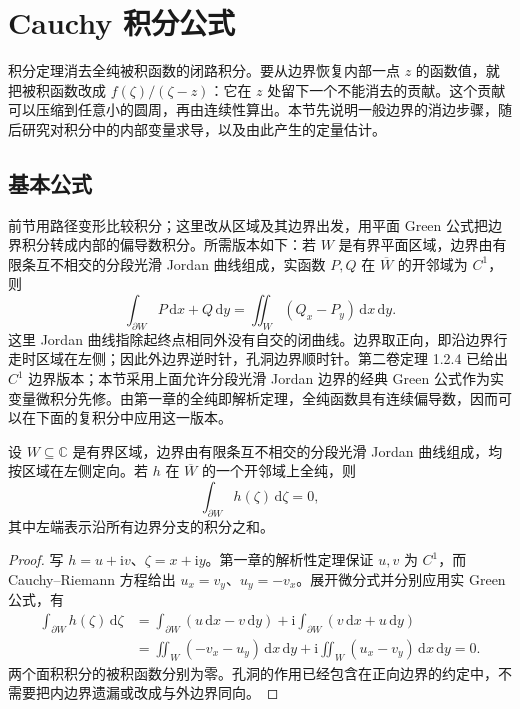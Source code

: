 \section{Cauchy 积分公式}
\label{b3:sec:0203}

积分定理消去全纯被积函数的闭路积分。要从边界恢复内部一点 \(z\) 的函数值，就把被积函数改成 \(f(\zeta)/(\zeta-z)\)：它在 \(z\) 处留下一个不能消去的贡献。这个贡献可以压缩到任意小的圆周，再由连续性算出。本节先说明一般边界的消边步骤，随后研究对积分中的内部变量求导，以及由此产生的定量估计。

\subsection{基本公式}
\label{b3:subsec:020301}

前节用路径变形比较积分；这里改从区域及其边界出发，用平面 Green 公式把边界积分转成内部的偏导数积分。所需版本如下：若 \(W\) 是有界平面区域，边界由有限条互不相交的分段光滑 Jordan 曲线组成，实函数 \(P,Q\) 在 \(\overline W\) 的开邻域为 \(C^1\)，则
\[
 \int_{\partial W}P\,\mathrm{d}x+Q\,\mathrm{d}y
 =\iint_W(Q_x-P_y)\,\mathrm{d}x\,\mathrm{d}y.
\]
这里 Jordan 曲线指除起终点相同外没有自交的闭曲线。边界取正向，即沿边界行走时区域在左侧；因此外边界逆时针，孔洞边界顺时针。第二卷定理 1.2.4 已给出 \(C^1\) 边界版本；本节采用上面允许分段光滑 Jordan 边界的经典 Green 公式作为实变量微积分先修。由第一章的全纯即解析定理，全纯函数具有连续偏导数，因而可以在下面的复积分中应用这一版本。

\begin{lemma}\label{b3:lem:02-cauchy-boundary}
设 \(W\subseteq\mathbb C\) 是有界区域，边界由有限条互不相交的分段光滑 Jordan 曲线组成，均按区域在左侧定向。若 \(h\) 在 \(\overline W\) 的一个开邻域上全纯，则
\[
 \int_{\partial W}h(\zeta)\,\mathrm{d}\zeta=0,
\]
其中左端表示沿所有边界分支的积分之和。
\end{lemma}
\begin{proof}
写 \(h=u+\mathrm{i}v\)、\(\zeta=x+\mathrm{i}y\)。第一章的解析性定理保证 \(u,v\) 为 \(C^1\)，而 Cauchy--Riemann 方程给出 \(u_x=v_y\)、\(u_y=-v_x\)。展开微分式并分别应用实 Green 公式，有
\[
 \begin{aligned}
 \int_{\partial W}h(\zeta)\,\mathrm{d}\zeta
 &=\int_{\partial W}(u\,\mathrm{d}x-v\,\mathrm{d}y)
   +\mathrm{i}\int_{\partial W}(v\,\mathrm{d}x+u\,\mathrm{d}y)\\
 &=\iint_W(-v_x-u_y)\,\mathrm{d}x\,\mathrm{d}y
   +\mathrm{i}\iint_W(u_x-v_y)\,\mathrm{d}x\,\mathrm{d}y=0.
 \end{aligned}
\]
两个面积积分的被积函数分别为零。孔洞的作用已经包含在正向边界的约定中，不需要把内边界遗漏或改成与外边界同向。
\end{proof}

